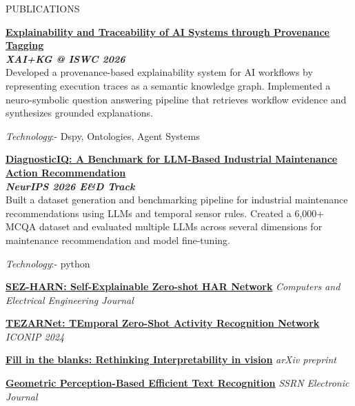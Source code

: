 \documentclass{resume} %
\begin{document}

\begin{rSection}{PUBLICATIONS}
\vspace{-1.25em}
\item \textbf{\href{https://github.com/DevinDeSilva/LLM-Workflow-Explorer}{Explainability and Traceability of AI Systems through
Provenance Tagging}}\\
\textit{\textbf{XAI+KG @ ISWC 2026}}\\
Developed a provenance-based explainability system for AI workflows by representing execution traces as a semantic knowledge graph. Implemented a neuro-symbolic question answering pipeline that retrieves workflow evidence and synthesizes grounded explanations.

\textit{Technology}:- Dspy, Ontologies, Agent Systems 

\item \textbf{\href{https://arxiv.org/abs/2605.08614}{DiagnosticIQ: A Benchmark for LLM-Based Industrial Maintenance Action Recommendation}}\\ 
\textit{\textbf{NeurIPS 2026 E\&D Track}} \\
Built a dataset generation and benchmarking pipeline for industrial maintenance recommendations using LLMs and temporal sensor rules. Created a 6,000+ MCQA dataset and evaluated multiple LLMs across several dimensions for maintenance recommendation and model fine-tuning.

\textit{Technology}:- python  

\item \textbf{\href{https://www.sciencedirect.com/science/article/abs/pii/S0045790626006348}{SEZ-HARN: Self-Explainable Zero-shot HAR Network}} \hfill \textit{Computers and Electrical Engineering Journal}
\item \textbf{\href{https://link.springer.com/chapter/10.1007/978-981-99-8184-7_34}{TEZARNet: TEmporal Zero-Shot Activity Recognition Network}} \hfill \textit{ICONIP 2024}
\item \textbf{\href{https://arxiv.org/abs/2411.10273}{Fill in the blanks: Rethinking Interpretability in vision}} \hfill \textit{arXiv preprint}
\item \textbf{\href{https://arxiv.org/abs/2302.03873}{Geometric Perception-Based Efficient Text Recognition}} \hfill \textit{SSRN Electronic Journal}


\end{rSection} 
\end{document}
